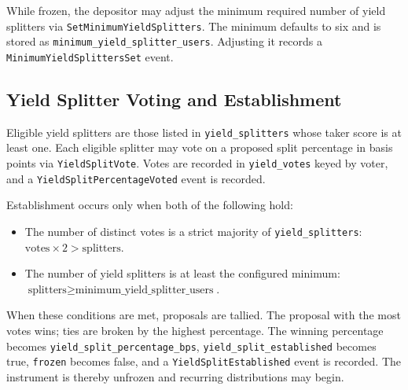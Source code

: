 \documentclass[11pt,a4paper]{article}
\begin{document}
While frozen, the depositor may adjust the minimum required number of yield splitters via \texttt{SetMinimumYieldSplitters}. The minimum defaults to six and is stored as \texttt{minimum\_yield\_splitter\_users}. Adjusting it records a \texttt{MinimumYieldSplittersSet} event.

\subsection{Yield Splitter Voting and Establishment}
Eligible yield splitters are those listed in \texttt{yield\_splitters} whose taker score is at least one. Each eligible splitter may vote on a proposed split percentage in basis points via \texttt{YieldSplitVote}. Votes are recorded in \texttt{yield\_votes} keyed by voter, and a \texttt{YieldSplitPercentageVoted} event is recorded.

Establishment occurs only when both of the following hold:
\begin{itemize}
\item The number of distinct votes is a strict majority of \texttt{yield\_splitters}: $\text{votes} \times 2 > \text{splitters}$.
\item The number of yield splitters is at least the configured minimum: $\text{splitters} \geq \text{minimum\_yield\_splitter\_users}$.
\end{itemize}
When these conditions are met, proposals are tallied. The proposal with the most votes wins; ties are broken by the highest percentage. The winning percentage becomes \texttt{yield\_split\_percentage\_bps}, \texttt{yield\_split\_established} becomes true, \texttt{frozen} becomes false, and a \texttt{YieldSplitEstablished} event is recorded. The instrument is thereby unfrozen and recurring distributions may begin.
\end{document}
